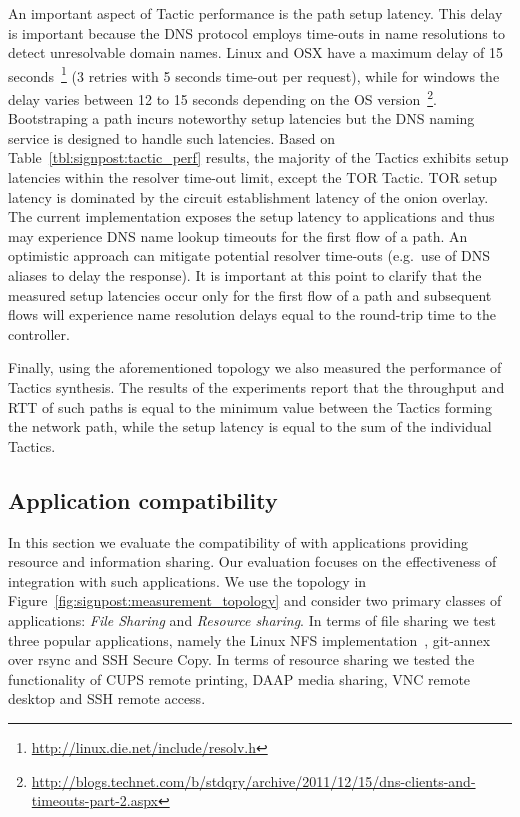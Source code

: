 An important aspect of Tactic performance is the path setup latency. This delay
is important because the DNS protocol employs time-outs in name resolutions to
detect unresolvable domain names. Linux and OSX have a maximum delay of 15
seconds~\footnote{\url{http://linux.die.net/include/resolv.h}} (3 retries with 5
seconds time-out per request), while for windows the delay varies between 12 to
15 seconds depending on the OS
version~\footnote{\url{http://blogs.technet.com/b/stdqry/archive/2011/12/15/dns-clients-and-timeouts-part-2.aspx}}.
Bootstraping a \signpost path incurs noteworthy setup latencies but the DNS
naming service is designed to handle such latencies.  Based on
Table~\ref{tbl:signpost:tactic_perf} results, the majority of the Tactics
exhibits setup latencies within the resolver time-out limit, except the TOR
Tactic. TOR setup latency is dominated by the circuit establishment latency of
the onion overlay.  The current implementation exposes the setup latency to
applications and thus may experience DNS name lookup timeouts for the first flow
of a path. An optimistic approach can mitigate potential resolver time-outs
(e.g.~use of DNS aliases to delay the response). It is important at this point
to clarify that the measured setup latencies occur only for the first flow
of a path and subsequent flows will experience name resolution delays
equal to the round-trip time to the \signpost controller. 

Finally, using the aforementioned topology we also measured the performance of
Tactics synthesis. The results of the experiments report that the throughput and
RTT of such paths is equal to the minimum value between the Tactics forming the
network path, while the setup latency is equal to the sum of the individual
Tactics. 

\subsection{Application compatibility} \label{sec:sp-compatibility}

In this section we evaluate the compatibility of \signpost with applications
providing resource and information sharing. Our evaluation focuses on the
effectiveness of \signpost integration with such applications.  We use the
topology in Figure~\ref{fig:signpost:measurement_topology} and consider two
primary classes of applications: \emph{File Sharing} and \emph{Resource
  sharing}.  In terms of file sharing we test three popular applications, namely
the Linux NFS implementation~, git-annex~ over
rsync and SSH Secure Copy.  In terms of resource sharing we tested the
functionality of CUPS remote printing, DAAP media sharing, VNC remote desktop
and SSH remote access. 

